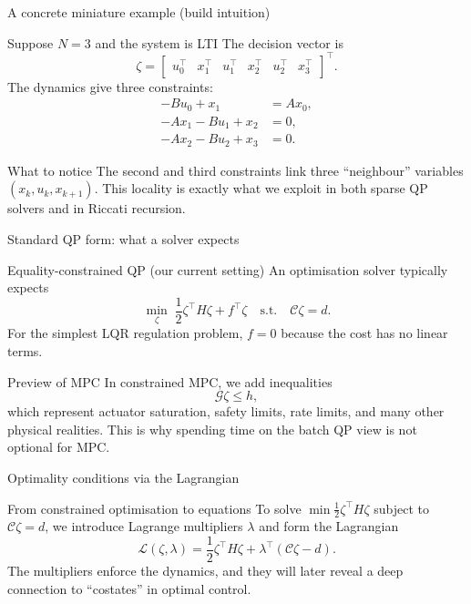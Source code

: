 \documentclass[aspectratio=169,11pt]{beamer}
\begin{document}
\begin{frame}{A concrete miniature example (build intuition)}
\begin{exampleblock}{Suppose $N=3$ and the system is LTI}
The decision vector is
\[
\zeta=\begin{bmatrix}u_0^\top&x_1^\top&u_1^\top&x_2^\top&u_2^\top&x_3^\top\end{bmatrix}^\top.
\]
The dynamics give three constraints:
\[
\begin{aligned}
-Bu_0 + x_1 &= Ax_0,\\
-Ax_1 - Bu_1 + x_2 &= 0,\\
-Ax_2 - Bu_2 + x_3 &= 0.
\end{aligned}
\]
\end{exampleblock}

\begin{block}{What to notice}
The second and third constraints link three ``neighbour'' variables $(x_k,u_k,x_{k+1})$. This locality is exactly what we exploit in both sparse QP solvers and in Riccati recursion.
\end{block}
\end{frame}

\begin{frame}{Standard QP form: what a solver expects}
\begin{block}{Equality-constrained QP (our current setting)}
An optimisation solver typically expects
\[
\min_{\zeta}\;\frac{1}{2}\zeta^\top H\zeta + f^\top\zeta
\quad\text{s.t.}\quad \mathcal{C}\zeta = d.
\]
For the simplest LQR regulation problem, $f=0$ because the cost has no linear terms.
\end{block}

\begin{alertblock}{Preview of MPC}
In constrained MPC, we add inequalities
\[
\mathcal{G}\zeta \le h,
\]
which represent actuator saturation, safety limits, rate limits, and many other physical realities.
This is why spending time on the batch QP view is not optional for MPC.
\end{alertblock}
\end{frame}

\begin{frame}{Optimality conditions via the Lagrangian}
\begin{block}{From constrained optimisation to equations}
To solve
\(\min \tfrac12\zeta^\top H\zeta\) subject to \(\mathcal{C}\zeta=d\),
we introduce Lagrange multipliers $\lambda$ and form the Lagrangian
\[
\mathcal{L}(\zeta,\lambda) = \frac12\zeta^\top H\zeta + \lambda^\top(\mathcal{C}\zeta-d).
\]
The multipliers enforce the dynamics, and they will later reveal a deep connection to ``costates'' in optimal control.
\end{block}
\end{frame}
\end{document}
